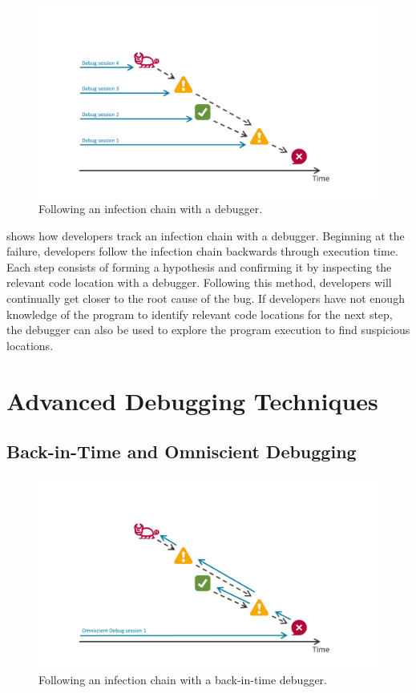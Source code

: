 \begin{figure}[th]
\centering
\includegraphics[width=.9\linewidth]{img/workflow-traditional}
\caption{Following an infection chain with a debugger.}
\label{fig:workflow-traditional}
\end{figure}

 shows how developers track an infection chain with a debugger.
Beginning at the failure, developers follow the infection chain backwards through execution time.
Each step consists of forming a hypothesis and confirming it by inspecting the relevant code location with a debugger.
Following this method, developers will continually get closer to the root cause of the bug.
If developers have not enough knowledge of the program to identify relevant code locations for the next step, the debugger can also be used to explore the program execution to find suspicious locations. 

\section{Advanced Debugging Techniques}

\subsection{Back-in-Time and Omniscient Debugging}

\begin{figure}[th]
\centering
\includegraphics[width=.9\linewidth]{img/workflow-odb}
\caption{Following an infection chain with a back-in-time debugger.}
\label{fig:workflow-odb}
\end{figure}

